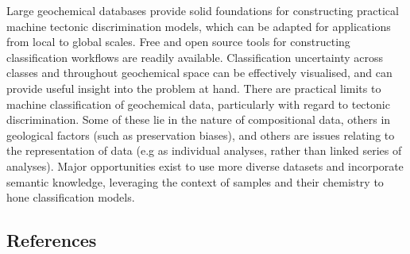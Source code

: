 \documentclass[a4,10pt]{article}
\begin{document}
\begin{multicols*}{2}[]
	Large geochemical databases provide solid foundations for constructing practical machine tectonic discrimination models, which can be adapted for applications from local to global scales. Free and open source tools for constructing classification workflows are readily available. Classification uncertainty across classes and throughout geochemical space can be effectively visualised, and can provide useful insight into the problem at hand. There are practical limits to machine classification of geochemical data, particularly with regard to tectonic discrimination. Some of these lie in the nature of compositional data, others in geological factors (such as preservation biases), and others are issues relating to the representation of data (e.g as individual analyses, rather than linked series of analyses). Major opportunities exist to use more diverse datasets and incorporate semantic knowledge, leveraging the context of samples and their chemistry to hone classification models.
	
	\begin{singlespace*}
	\subsection*{References}
	\footnotesize{
		
	}
	\end{singlespace*}
	\end{multicols*}
	
	
\end{document}

